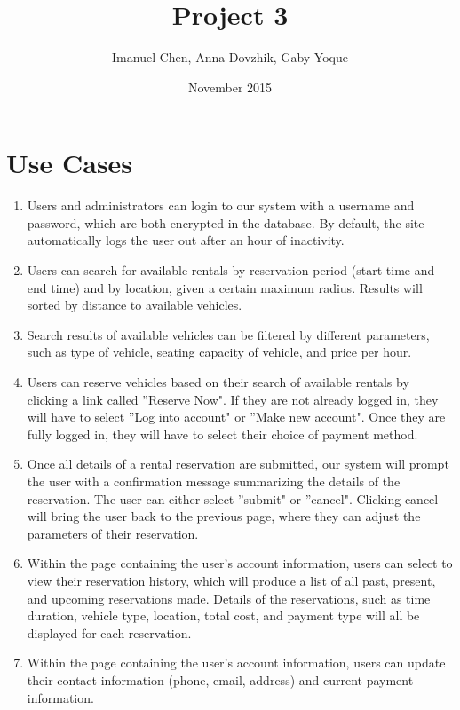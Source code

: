 \documentclass{article}
\title{Project 3}
\author{Imanuel Chen, Anna Dovzhik, Gaby Yoque}
\date{November 2015}
\begin{document}
\maketitle

\section{Use Cases}
\begin{enumerate}

\item Users and administrators can login to our system with a username and password, which are both encrypted in the database. By default, the site automatically logs the user out after an hour of inactivity. 

\item Users can search for available rentals by reservation period (start time and end time) and by location, given a certain maximum radius. Results will sorted by distance to available vehicles.

\item Search results of available vehicles can be filtered by different parameters, such as type of vehicle, seating capacity of vehicle, and price per hour.

\item Users can reserve vehicles based on their search of available rentals by clicking a link called ''Reserve Now". If they are not already logged in, they will have to select ''Log into account" or ''Make new account". Once they are fully logged in, they will have to select their choice of payment method.

\item Once all details of a rental reservation are submitted, our system will prompt the user with a confirmation message summarizing the details of the reservation. The user can either select ''submit" or ''cancel". Clicking cancel will bring the user back to the previous page, where they can adjust the parameters of their reservation.

\item Within the page containing the user's account information, users can select to view their reservation history, which will produce a list of all past, present, and upcoming reservations made. Details of the reservations, such as time duration, vehicle type, location, total cost, and payment type will all be displayed for each reservation.

\item Within the page containing the user's account information, users can update their contact information (phone, email, address) and current payment information.


\end{enumerate}
\end{document}
